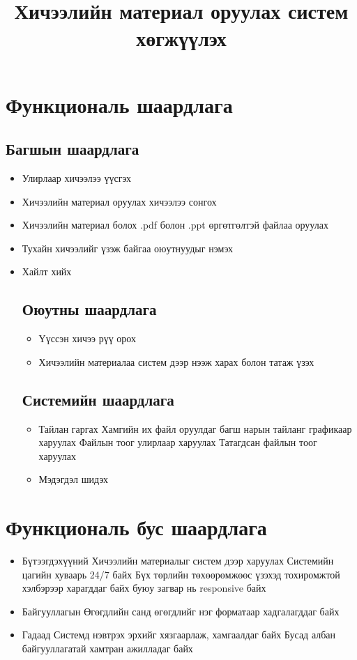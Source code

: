 \documentclass[12pt]{article}
\title {Хичээлийн материал оруулах систем хөгжүүлэх}
\begin{document}
	\maketitle
	\section{Функциональ шаардлага}
		\subsection{Багшын шаардлага}
	\begin{itemize}
	
		\item Улирлаар хичээлээ үүсгэх
		\item Хичээлийн материал оруулах хичээлээ сонгох
		\item Хичээлийн материал болох .pdf болон .ppt өргөтгөлтэй файлаа оруулах
		\item Тухайн хичээлийг үзэж байгаа оюутнуудыг нэмэх
		
		
		
		\item Хайлт хийх
		
			\subsection{Оюутны шаардлага}
			\begin{itemize}
				\item Үүссэн хичээ рүү орох
				\item Хичээлийн материалаа систем дээр нээж харах болон татаж үзэх
			\end{itemize}
		
		\subsection{Системийн шаардлага}
		\begin{itemize}
			\item Тайлан гаргах
				\subitem Хамгийн их файл оруулдаг багш нарын тайланг графикаар харуулах
				\subitem Файлын тоог улирлаар харуулах
				\subitem Татагдсан файлын тоог харуулах
			\item Мэдэгдэл шидэх
		\end{itemize}
	\end{itemize}
	\section{Функциональ бус шаардлага}
		\begin{itemize}
			\item Бүтээгдэхүүний 
			\subitem Хичээлийн материалыг систем дээр харуулах
			\subitem Системийн цагийн хуваарь 24/7 байх
			\subitem Бүх төрлийн төхөөрөмжөөс үзэхэд тохиромжтой хэлбэрээр харагддаг байх буюу загвар нь responsive байх
			
			\item Байгууллагын
			\subitem Өгөгдлийн санд өгөгдлийг нэг форматаар хадгалагддаг байх
			
			\item Гадаад
			\subitem Системд нэвтрэх эрхийг хязгаарлаж, хамгаалдаг байх
			\subitem Бусад албан байгууллагатай хамтран ажилладаг байх
		\end{itemize}
\end{document}

